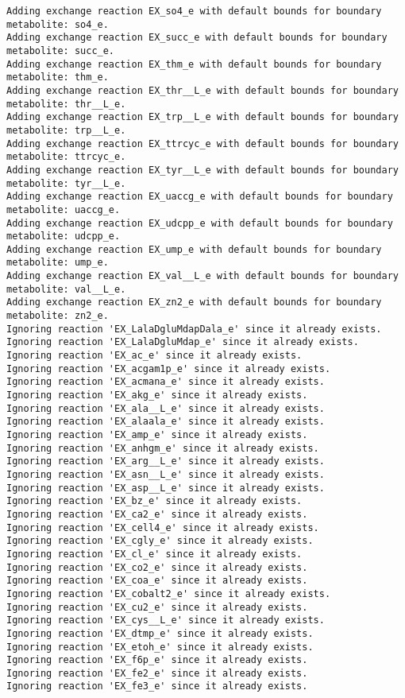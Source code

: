 \documentclass[
  letterpaper,
  DIV=11,
  numbers=noendperiod]{scrartcl}
\begin{document}
\begin{verbatim}
Adding exchange reaction EX_so4_e with default bounds for boundary metabolite: so4_e.
Adding exchange reaction EX_succ_e with default bounds for boundary metabolite: succ_e.
Adding exchange reaction EX_thm_e with default bounds for boundary metabolite: thm_e.
Adding exchange reaction EX_thr__L_e with default bounds for boundary metabolite: thr__L_e.
Adding exchange reaction EX_trp__L_e with default bounds for boundary metabolite: trp__L_e.
Adding exchange reaction EX_ttrcyc_e with default bounds for boundary metabolite: ttrcyc_e.
Adding exchange reaction EX_tyr__L_e with default bounds for boundary metabolite: tyr__L_e.
Adding exchange reaction EX_uaccg_e with default bounds for boundary metabolite: uaccg_e.
Adding exchange reaction EX_udcpp_e with default bounds for boundary metabolite: udcpp_e.
Adding exchange reaction EX_ump_e with default bounds for boundary metabolite: ump_e.
Adding exchange reaction EX_val__L_e with default bounds for boundary metabolite: val__L_e.
Adding exchange reaction EX_zn2_e with default bounds for boundary metabolite: zn2_e.
Ignoring reaction 'EX_LalaDgluMdapDala_e' since it already exists.
Ignoring reaction 'EX_LalaDgluMdap_e' since it already exists.
Ignoring reaction 'EX_ac_e' since it already exists.
Ignoring reaction 'EX_acgam1p_e' since it already exists.
Ignoring reaction 'EX_acmana_e' since it already exists.
Ignoring reaction 'EX_akg_e' since it already exists.
Ignoring reaction 'EX_ala__L_e' since it already exists.
Ignoring reaction 'EX_alaala_e' since it already exists.
Ignoring reaction 'EX_amp_e' since it already exists.
Ignoring reaction 'EX_anhgm_e' since it already exists.
Ignoring reaction 'EX_arg__L_e' since it already exists.
Ignoring reaction 'EX_asn__L_e' since it already exists.
Ignoring reaction 'EX_asp__L_e' since it already exists.
Ignoring reaction 'EX_bz_e' since it already exists.
Ignoring reaction 'EX_ca2_e' since it already exists.
Ignoring reaction 'EX_cell4_e' since it already exists.
Ignoring reaction 'EX_cgly_e' since it already exists.
Ignoring reaction 'EX_cl_e' since it already exists.
Ignoring reaction 'EX_co2_e' since it already exists.
Ignoring reaction 'EX_coa_e' since it already exists.
Ignoring reaction 'EX_cobalt2_e' since it already exists.
Ignoring reaction 'EX_cu2_e' since it already exists.
Ignoring reaction 'EX_cys__L_e' since it already exists.
Ignoring reaction 'EX_dtmp_e' since it already exists.
Ignoring reaction 'EX_etoh_e' since it already exists.
Ignoring reaction 'EX_f6p_e' since it already exists.
Ignoring reaction 'EX_fe2_e' since it already exists.
Ignoring reaction 'EX_fe3_e' since it already exists.

\end{verbatim}
\end{document}
